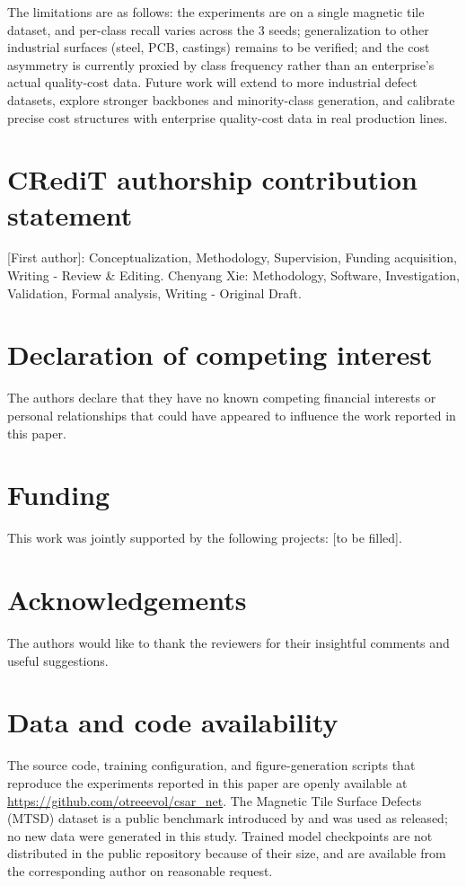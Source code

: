 \documentclass[a4paper,fleqn]{cas-sc}
\begin{document}
\begin{sloppypar}
	\par{
		The limitations are as follows: the experiments are on a single magnetic tile dataset, and per-class recall varies across the 3 seeds; generalization to other industrial surfaces (steel, PCB, castings) remains to be verified; and the cost asymmetry is currently proxied by class frequency rather than an enterprise's actual quality-cost data. Future work will extend to more industrial defect datasets, explore stronger backbones and minority-class generation, and calibrate precise cost structures with enterprise quality-cost data in real production lines.
	}

	\section*{CRediT authorship contribution statement}
	\par{[First author]: Conceptualization, Methodology, Supervision, Funding acquisition, Writing - Review \& Editing. Chenyang Xie: Methodology, Software, Investigation, Validation, Formal analysis, Writing - Original Draft.}

	\section*{Declaration of competing interest}
	\par{The authors declare that they have no known competing financial interests or personal relationships that could have appeared to influence the work reported in this paper.}

	\section*{Funding}
	\par{This work was jointly supported by the following projects: [to be filled].}

	\section*{Acknowledgements}
	\par{The authors would like to thank the reviewers for their insightful comments and useful suggestions.}

	\section*{Data and code availability}
	\par{The source code, training configuration, and figure-generation scripts that reproduce the experiments reported in this paper are openly available at \url{https://github.com/otreeevol/csar_net}. The Magnetic Tile Surface Defects (MTSD) dataset is a public benchmark introduced by \citet{huang2020surface} and was used as released; no new data were generated in this study. Trained model checkpoints are not distributed in the public repository because of their size, and are available from the corresponding author on reasonable request.}

	
	

\end{sloppypar}
\end{document}
